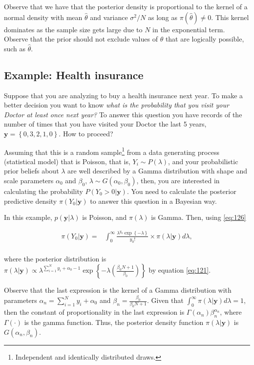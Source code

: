 Observe that we have that the posterior density is proportional to the kernel of a normal density with mean $\hat{\theta}$ and variance $\sigma^2/N$ as long as $\pi(\hat{\theta})\neq 0$. This kernel dominates as the sample size gets large due to $N$ in the exponential term. Observe that the prior should not exclude values of $\theta$ that are logically possible, such as $\hat{\theta}$.

\subsection{Example: Health insurance}\label{sec121}

Suppose that you are analyzing to buy a health insurance next year. To make a better decision you want to know \textit{what is the probability that you visit your Doctor at least once next year?} To answer this question you have records of the number of times that you have visited your Doctor the last 5 years, $\mathbf{y}=\left\{0, 3, 2, 1, 0\right\}$. How to proceed?

Assuming that this is a random sample\footnote{Independent and identically distributed draws.} from a data generating process (statistical model) that is Poisson, that is, $Y_i\sim P(\lambda)$, and your probabilistic prior beliefs about $\lambda$ are well described by a Gamma distribution with shape and scale parameters $\alpha_0$ and $\beta_0$, $\lambda\sim G(\alpha_0, \beta_0)$, then, you are interested in calculating the probability $P(Y_0>0|\mathbf{y})$. You need to calculate the posterior predictive density $\pi(Y_0|\mathbf{y})$ to answer this question in a Bayesian way.

In this example, $p(\mathbf{y}|\lambda)$ is Poisson, and $\pi(\lambda)$ is Gamma. Then, using \ref{eq:126} 

\begin{align*}
	\pi(Y_0|\mathbf{y})=&\int_{0}^{\infty}\frac{\lambda^{y_0}\exp\left\{-\lambda\right\}}{y_0!}\times \pi(\lambda|\mathbf{y})d\lambda,\\
\end{align*}

where the posterior distribution is $\pi(\lambda|\mathbf{y})\propto \lambda^{\sum_{i=1}^N y_i + \alpha_0 - 1}\exp\left\{-\lambda\left(\frac{\beta_0 N+1}{\beta_0}\right)\right\}$ by equation \ref{eq:121}.

Observe that the last expression is the kernel of a Gamma distribution with parameters $\alpha_n=\sum_{i=1}^N y_i + \alpha_0$ and $\beta_n=\frac{\beta_0}{\beta_0 N + 1}$. Given that $\int_0^{\infty}\pi(\lambda|\mathbf{y})d\lambda=1$, then the constant of proportionality in the last expression is $\Gamma(\alpha_n)\beta_n^{\alpha_n}$, where $\Gamma(\cdot)$ is the gamma function. Thus, the posterior density function $\pi(\lambda|\mathbf{y})$ is $G(\alpha_n,\beta_n)$.

